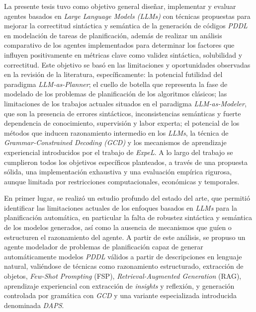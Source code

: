 \begin{conclusions}
La presente tesis tuvo como objetivo general diseñar, implementar y evaluar agentes basados en \textit{Large Language Models (LLMs)} con técnicas propuestas para mejorar la correctitud sintáctica y semántica de la generación de códigos \textit{PDDL} en modelación de tareas de planificación, además de realizar un análisis comparativo de los agentes implementados para determinar los factores que influyen positivamente en métricas clave como validez sintáctica, solubilidad y correctitud. Este objetivo se basó en las limitaciones y oportunidades observadas en la revisión de la literatura, específicamente: la potencial futilidad del paradigma \textit{LLM-as-Planner}; el cuello de botella que representa la fase de modelado de los problemas de planificación de los algoritmos clásicos; las limitaciones de los trabajos actuales situados en el paradigma \textit{LLM-as-Modeler}, que son la presencia de errores sintácticos, inconsistencias semánticas y fuerte dependencia de conocimiento, supervisión y labor experta; el potencial de los métodos que inducen razonamiento intermedio en los \textit{LLMs}, la técnica de \textit{Grammar-Constrained Decoding (GCD)} y los mecanismos de aprendizaje experiencial introducidos por el trabajo de \textit{ExpeL}. A lo largo del trabajo se cumplieron todos los objetivos específicos planteados, a través de una propuesta sólida, una implementación exhaustiva y una evaluación empírica rigurosa, aunque limitada por restricciones computacionales, económicas y temporales.

En primer lugar, se realizó un estudio profundo del estado del arte, que permitió identificar las limitaciones actuales de los enfoques basados en \textit{LLMs} para la planificación automática, en particular la falta de robustez sintáctica y semántica de los modelos generados, así como la ausencia de mecanismos que guíen o estructuren el razonamiento del agente. A partir de este análisis, se propuso un agente modelador de problemas de planificación capaz de generar automáticamente modelos \textit{PDDL} válidos a partir de descripciones en lenguaje natural, valiéndose de técnicas como razonamiento estructurado, extracción de objetos, \textit{Few-Shot Prompting} (FSP), \textit{Retrieval-Augmented Generation} (RAG), aprendizaje experiencial con extracción de \textit{insights} y reflexión, y generación controlada por gramática con \textit{GCD} y una variante especializada introducida denominada \textit{DAPS}.


\end{conclusions}
